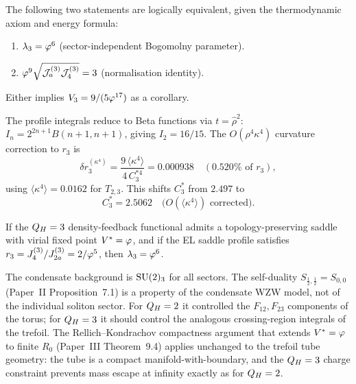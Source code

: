 \begin{theorem}
\label{P15:thm:equivalence}
The following two statements are logically equivalent, given the
thermodynamic axiom and energy formula:
\begin{enumerate}[noitemsep,label=(\Roman*)]
\item $\lambda_3 = \varphi^6$ (sector-independent Bogomolny parameter).
\item $\varphi^9\sqrt{\mathcal{J}_a^{(3)}\mathcal{J}_4^{(3)}} = 3$ (normalisation identity).
\end{enumerate}
Either implies $V_3=9/(5\varphi^{17})$ as a corollary.
\end{theorem}

\begin{proposition}
\label{P15:prop:kappa4}
The profile integrals reduce to Beta functions via $t=\hat\rho^2$:
$I_n = 2^{2n+1}B(n+1,n+1)$, giving $I_2=16/15$.
The $O(\rho^4\kappa^4)$ curvature correction to $r_3$ is
\begin{equation}
  \delta r_3^{(\kappa^4)}
  = \frac{9\,\langle\kappa^4\rangle}{4\,C_3^{*4}}
  = 0.000938 \quad (0.520\%\text{ of }r_3),
  \label{P15:eq:dr_kappa4_num}
\end{equation}
using $\langle\kappa^4\rangle=0.0162$ for $T_{2,3}$.
This shifts $C_3^*$ from $2.497$ to
\begin{equation}
  \boxed{C_3^* = 2.5062 \quad\bigl(O(\langle\kappa^4\rangle)\text{ corrected}\bigr).}
  \label{P15:eq:C3star_kappa4}
\end{equation}
\end{proposition}

\begin{proposition}
\label{P15:prop:lambda3}
If the $Q_H=3$ density-feedback functional admits a topology-preserving
saddle with virial fixed point $V^*=\varphi$, and if the EL saddle profile
satisfies $r_3 = J_4^{(3)}/J_{2a}^{(3)} = 2/\varphi^5$, then
$\lambda_3=\varphi^6$.
\end{proposition}

\begin{remark}
\label{P15:rem:why_same_self_duality}
The condensate background is $\mathrm{SU}(2)_3$ for all sectors.
The self-duality $S_{\frac12,\frac12}=S_{0,0}$
(Paper~II Proposition~7.1) is a property of the condensate WZW model,
not of the individual soliton sector.
For $Q_H=2$ it controlled the $F_{12},F_{23}$ components of the
torus; for $Q_H=3$ it should control the analogous crossing-region
integrals of the trefoil.
The Rellich--Kondrachov compactness argument that extends
$V^*=\varphi$ to finite $R_0$ (Paper~III Theorem~9.4) applies unchanged
to the trefoil tube geometry: the tube is a compact
manifold-with-boundary, and the $Q_H=3$ charge constraint prevents
mass escape at infinity exactly as for $Q_H=2$.
\end{remark}

